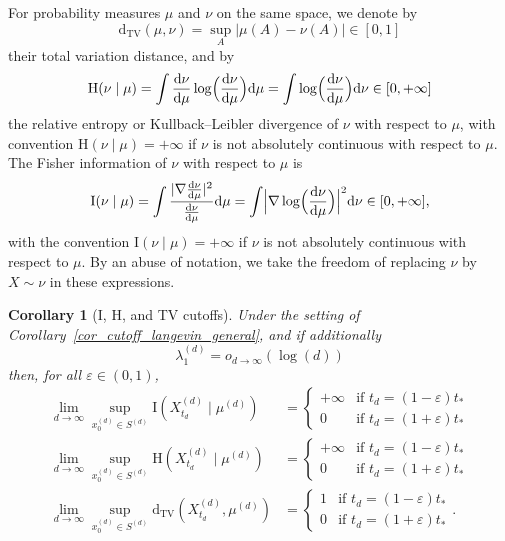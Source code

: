\documentclass[10pt,reqno]{amsart}
\newtheorem{corollary}[theorem]{Corollary}
\numberwithin{equation}{section}
\newcommand{\DTV}{\mathrm{d}_{\mathrm{TV}}}
\begin{document}
For probability measures $\mu$ and $\nu$ on the same space, we denote by
\begin{equation}
    \DTV(\mu,\nu)=\sup_A|\mu(A)-\nu(A)|\in[0,1]
\end{equation}
their total variation distance, and by
\begin{equation}
\mathrm{H}(\nu\mid\mu)
=\int\frac{\mathrm{d}\nu}{\mathrm{d}\mu}\log\Bigl(\frac{\mathrm{d}\nu}{\mathrm{d}\mu}\Bigr)\mathrm{d}\mu
=\int\log\Bigl(\frac{\mathrm{d}\nu}{\mathrm{d}\mu}\Bigr)\mathrm{d}\nu
\in[0,+\infty]
\end{equation}
the relative entropy or Kullback--Leibler divergence of $\nu$ with respect
to $\mu$, with convention $\mathrm{H}(\nu\mid\mu)=+\infty$ if $\nu$ is not
absolutely continuous with respect to $\mu$. The Fisher information of $\nu$ with respect to $\mu$ is 
\begin{equation}
  \mathrm{I}(\nu\mid\mu)
  =\int\frac{|\nabla\frac{\mathrm{d}\nu}{\mathrm{d}\mu}|^2}{\frac{\mathrm{d}\nu}{\mathrm{d}\mu}}\mathrm{d}\mu
  =\int\Bigl|\nabla\log\Bigl(\frac{\mathrm{d}\nu}{\mathrm{d}\mu}\Bigr)\Bigr|^2\mathrm{d}\nu
  \in[0,+\infty],
\end{equation}
with the convention $\mathrm{I}(\nu\mid\mu)=+\infty$ if $\nu$ is not absolutely continuous with respect to $\mu$. 
By an abuse of notation, we take the freedom of replacing $\nu$ by $X\sim\nu$ in these expressions. 

\begin{corollary}[I, H, and TV cutoffs] \label{co:cutoff:tv:H} Under the
  setting of Corollary~\ref{cor_cutoff_langevin_general}, and if additionally
  \begin{equation}
    \lambda_1^{(d)}=o_{d\to\infty}(\log(d))
  \end{equation}
  then, for all $\varepsilon\in(0,1)$,
 \begin{align}
     \lim_{d\to\infty}
     \sup_{x^{(d)}_0\in S^{(d)}}
     \mathrm{I}(X^{(d)}_{t_d}\mid\mu^{(d)})
     &=
     \begin{cases}
     +\infty & \text{if $t_d=(1-\varepsilon)t_*$}\\
     0 & \text{if $t_d=(1+\varepsilon)t_*$}
     \end{cases}\label{eq:cutoff:I}\\
     \lim_{d\to\infty}
     \sup_{x^{(d)}_0\in S^{(d)}}
     \mathrm{H}(X^{(d)}_{t_d}\mid\mu^{(d)})
     &=
     \begin{cases}
     +\infty & \text{if $t_d=(1-\varepsilon)t_*$}\\
     0 & \text{if $t_d=(1+\varepsilon)t_*$}
     \end{cases}\label{eq:cutoff:H}\\
     \lim_{d\to\infty}
     \sup_{x^{(d)}_0\in S^{(d)}}
     \DTV(X^{(d)}_{t_d},\mu^{(d)})
     &=
     \begin{cases}
     1 & \text{if $t_d=(1-\varepsilon)t_*$}\\
     0 & \text{if $t_d=(1+\varepsilon)t_*$}
     \end{cases}. \label{eq:cutoff:TV}
 \end{align} 
\end{corollary}
\end{document}
